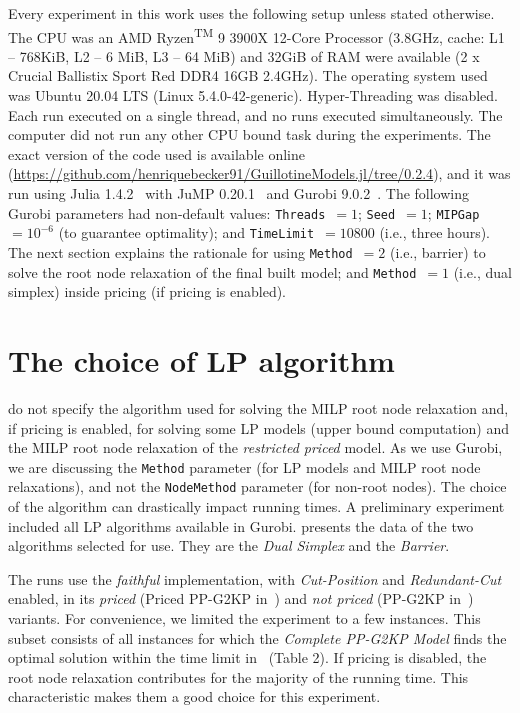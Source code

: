 \documentclass[ppgc,prop-tese,english,formais,babel]{iiufrgs}
\begin{document}
Every experiment in this work uses the following setup unless stated otherwise.
The CPU was an AMD\textsuperscript{\textregistered} Ryzen\textsuperscript{TM} 9 3900X 12-Core Processor (3.8GHz, cache: L1 -- 768KiB, L2 -- 6 MiB, L3 -- 64 MiB) and 32GiB of RAM were available (2 x Crucial Ballistix Sport Red DDR4 16GB 2.4GHz).
The operating system used was Ubuntu 20.04 LTS (Linux 5.4.0-42-generic).
Hyper-Threading was disabled.
Each run executed on a single thread, and no runs executed simultaneously.
The computer did not run any other CPU bound task during the experiments.
The exact version of the code used is available online (\url{https://github.com/henriquebecker91/GuillotineModels.jl/tree/0.2.4}), and it was run using Julia 1.4.2~\citep{julia} with JuMP 0.20.1~\citep{JuMP} and Gurobi 9.0.2~\citep{gurobi}.
The following Gurobi parameters had non-default values: \verb+Threads+~\(= 1\); \verb+Seed+~\(= 1\); \verb+MIPGap+~\(= 10^{-6}\) (to guarantee optimality); and \verb+TimeLimit+~\(= 10800\) (i.e., three hours).
The next section explains the rationale for using \verb+Method+~\(= 2\) (i.e., barrier) to solve the root node relaxation of the final built model; and \verb+Method+~\(= 1\) (i.e., dual simplex) inside pricing (if pricing is enabled).

\section{The choice of LP algorithm}
\label{sec:lp_method}

\citet{dimitri_thesis} do not specify the algorithm used for solving the MILP root node relaxation and, if pricing is enabled, for solving some LP models (upper bound computation) and the MILP root node relaxation of the \emph{restricted priced} model.
As we use Gurobi, we are discussing the \verb+Method+ parameter (for LP models and MILP root node relaxations), and not the \verb+NodeMethod+ parameter (for non-root nodes).
The choice of the algorithm can drastically impact running times.
A preliminary experiment included all LP algorithms available in Gurobi.
 presents the data of the two algorithms selected for use.
They are the \emph{Dual Simplex} and the \emph{Barrier}.

The runs use the \emph{faithful} implementation, with \emph{Cut-Position} and \emph{Redundant-Cut} enabled, in its \emph{priced} (Priced PP-G2KP in~\citet{dimitri_thesis}) and \emph{not priced} (PP-G2KP in~\citet{dimitri_thesis}) variants.
For convenience, we limited the experiment to a few instances.
This subset consists of all instances for which the \emph{Complete PP-G2KP Model} finds the optimal solution within the time limit in~\citet{furini:2016} (Table 2).
If pricing is disabled, the root node relaxation contributes for the majority of the running time.
This characteristic makes them a good choice for this experiment.
\end{document}
